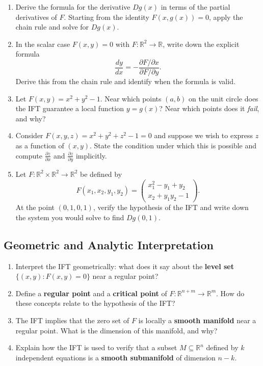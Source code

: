 \begin{enumerate}[resume, leftmargin=*, label=\textbf{Q\arabic*.}]
  \item Derive the formula for the derivative $Dg(x)$ in terms of the partial derivatives of $F$. Starting from the identity $F(x, g(x)) = 0$, apply the chain rule and solve for $Dg(x)$.
  \item In the scalar case $F(x, y) = 0$ with $F : \mathbb{R}^2 \to \mathbb{R}$, write down the explicit formula
    \[
      \frac{dy}{dx} = -\frac{\partial F / \partial x}{\partial F / \partial y}.
    \]
    Derive this from the chain rule and identify when the formula is valid.
  \item Let $F(x, y) = x^2 + y^2 - 1$. Near which points $(a,b)$ on the unit circle does the IFT guarantee a local function $y = g(x)$? Near which points does it \emph{fail}, and why?
  \item Consider $F(x,y,z) = x^2 + y^2 + z^2 - 1 = 0$ and suppose we wish to express $z$ as a function of $(x,y)$. State the condition under which this is possible and compute $\frac{\partial z}{\partial x}$ and $\frac{\partial z}{\partial y}$ implicitly.
  \item Let $F : \mathbb{R}^2 \times \mathbb{R}^2 \to \mathbb{R}^2$ be defined by
    \[
      F(x_1, x_2, y_1, y_2) =
      \begin{pmatrix} x_1^2 - y_1 + y_2 \\ x_2 + y_1 y_2 - 1
      \end{pmatrix}.
    \]
    At the point $(0,1,0,1)$, verify the hypothesis of the IFT and write down the system you would solve to find $Dg(0,1)$.
\end{enumerate}

\subsection{Geometric and Analytic Interpretation}

\begin{enumerate}[resume, leftmargin=*, label=\textbf{Q\arabic*.}]
  \item Interpret the IFT geometrically: what does it say about the \textbf{level set} $\{(x,y) : F(x,y) = 0\}$ near a regular point?
  \item Define a \textbf{regular point} and a \textbf{critical point} of $F : \mathbb{R}^{n+m} \to \mathbb{R}^m$. How do these concepts relate to the hypothesis of the IFT?
  \item The IFT implies that the zero set of $F$ is locally a \textbf{smooth manifold} near a regular point. What is the dimension of this manifold, and why?
  \item Explain how the IFT is used to verify that a subset $M \subseteq \mathbb{R}^n$ defined by $k$ independent equations is a \textbf{smooth submanifold} of dimension $n - k$.
\end{enumerate}


